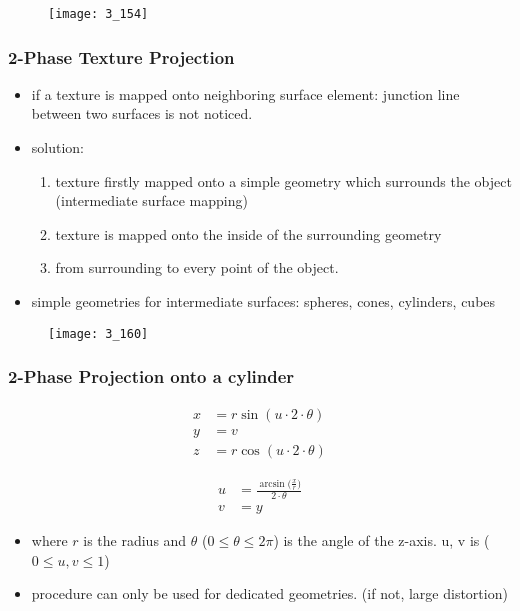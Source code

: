 \documentclass{standalone}
\begin{document}
\begin{figure}[H]
	\texttt{[image: 3\_154]}
\end{figure} 

\subsubsection*{2-Phase Texture Projection}

\begin{itemize}
	\item if a texture is mapped onto neighboring surface element: junction line between two surfaces is not noticed.
	\item solution:
		\begin{enumerate}
			\item texture firstly mapped onto a simple geometry which surrounds the object (intermediate surface mapping) 
			\item texture is mapped onto the inside of the surrounding geometry
			\item from surrounding to every point of the object.
		\end{enumerate} 
	\item simple geometries for intermediate surfaces: spheres, cones, cylinders, cubes
\end{itemize}       

\begin{figure}[H]
	\texttt{[image: 3\_160]}
\end{figure} 

\subsubsection*{2-Phase Projection onto a cylinder}

\begin{align}
	x &= r \sin (u \cdot 2 \cdot \theta) \\
	y &= v \\
	z &= r \cos (u \cdot 2 \cdot \theta)
\end{align}

\begin{align}
	u &= \frac{\arcsin \big( \frac{x}{r} \big)}{2 \cdot \theta} \\
	v &= y 
\end{align}

\begin{itemize}
	\item where $r$ is the radius and $\theta$ ($0 \leq \theta \leq 2\pi$) is the angle of the z-axis. u, v is ($0 \leq u, v \leq 1$)
	\item procedure can only be used for dedicated geometries. (if not, large distortion)
\end{itemize}
\end{document}
